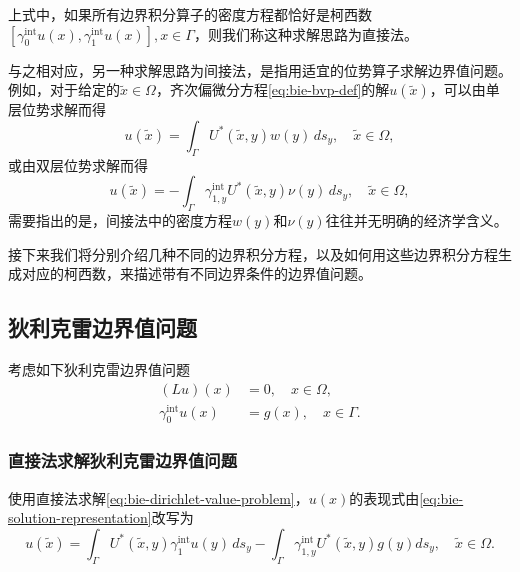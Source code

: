上式中，如果所有边界积分算子的密度方程都恰好是柯西数$\left[ \gamma_{0}^{\text{int}} u(x), \gamma_{1}^{\text{int}} u(x) \right], x \in \Gamma$，则我们称这种求解思路为直接法。

与之相对应，另一种求解思路为间接法，是指用适宜的位势算子求解边界值问题。例如，对于给定的$\widetilde{x} \in \Omega$，齐次偏微分方程\eqref{eq:bie-bvp-def}的解$u(\widetilde{x})$，可以由单层位势求解而得
\begin{equation}
  \label{eq:bie-indirect-single-layer}
  u(\widetilde{x}) = \int_{\Gamma} U^{*}(\widetilde{x}, y) w(y) \, d s_{y}, \quad \widetilde{x} \in \Omega,
\end{equation}
或由双层位势求解而得
\begin{equation*}
  \label{eq:bie-indirect-double-layer}
  u(\widetilde{x}) = - \int_{\Gamma}
  \gamma_{1,y}^{\text{int}} U^{*}(\widetilde{x}, y) \nu(y) \, d s_{y}, \quad \widetilde{x} \in \Omega,
\end{equation*}
需要指出的是，间接法中的密度方程$w(y)$和$\nu(y)$往往并无明确的经济学含义。

接下来我们将分别介绍几种不同的边界积分方程，以及如何用这些边界积分方程生成对应的柯西数，来描述带有不同边界条件的边界值问题。

\subsection{狄利克雷边界值问题}
\label{sec:bie-dirichlet}
考虑如下狄利克雷边界值问题
\begin{equation}
  \label{eq:bie-dirichlet-value-problem}
  \begin{split}
    \left( L u \right)(x) &=0, \quad x \in \Omega,\\
    \gamma_{0}^{\text{int}} u(x) &= g(x), \quad x \in \Gamma.
  \end{split}
\end{equation}

\subsubsection{直接法求解狄利克雷边界值问题}
\label{sec:bie-dirichlet-direct-approach}
使用直接法求解\eqref{eq:bie-dirichlet-value-problem}，$u(x)$的表现式由\eqref{eq:bie-solution-representation}改写为
\begin{equation}
  \label{eq:bie-dirichlet-solution-representation}
  u(\widetilde{x}) = \int_{\Gamma} U^{*}(\widetilde{x}, y) \gamma_{1}^{\text{int}} u(y) \, d s_{y}
  - \int_{\Gamma} \gamma_{1,y}^{\text{int}} U^{*}(\widetilde{x}, y) g(y) d s_{y}, \quad \widetilde{x} \in \Omega.
\end{equation}

